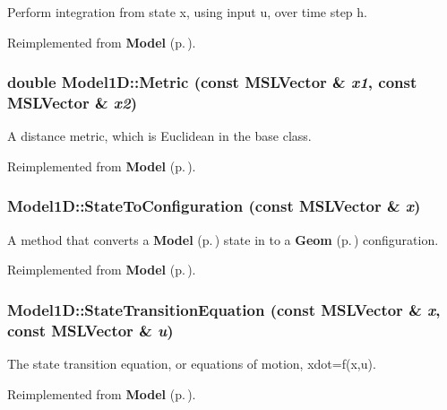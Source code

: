 Perform integration from state x, using input u, over time step h.



Reimplemented from {\bf Model} {\rm (p.\,\pageref{classModel_a5})}.
\subsubsection{\setlength{\rightskip}{0pt plus 5cm}double Model1D::Metric (const {\bf MSLVector} \& {\em x1}, const {\bf MSLVector} \& {\em x2})\hspace{0.3cm}{\tt  [virtual]}}\label{classModel1D_a5}


A distance metric, which is Euclidean in the base class.



Reimplemented from {\bf Model} {\rm (p.\,\pageref{classModel_a9})}.
\subsubsection{ Model1D::State\-To\-Configuration (const {\bf MSLVector} \& {\em x})\hspace{0.3cm}{\tt  [virtual]}}\label{classModel1D_a2}


A method that converts a {\bf Model} {\rm (p.\,\pageref{classModel})} state in to a {\bf Geom} {\rm (p.\,\pageref{classGeom})} configuration.



Reimplemented from {\bf Model} {\rm (p.\,\pageref{classModel_a8})}.
\subsubsection{ Model1D::State\-Transition\-Equation (const {\bf MSLVector} \& {\em x}, const {\bf MSLVector} \& {\em u})\hspace{0.3cm}{\tt  [virtual]}}\label{classModel1D_a4}


The state transition equation, or equations of motion, xdot=f(x,u).



Reimplemented from {\bf Model} {\rm (p.\,\pageref{classModel_a3})}.


